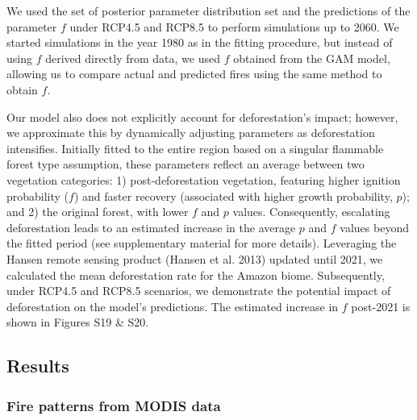 \documentclass[
]{article}
\begin{document}
We used the set of posterior parameter distribution set and the
predictions of the parameter \(f\) under RCP4.5 and RCP8.5 to perform
simulations up to 2060. We started simulations in the year 1980 as in
the fitting procedure, but instead of using \(f\) derived directly from
data, we used \(f\) obtained from the GAM model, allowing us to compare
actual and predicted fires using the same method to obtain \(f\).

Our model also does not explicitly account for deforestation's impact;
however, we approximate this by dynamically adjusting parameters as
deforestation intensifies. Initially fitted to the entire region based
on a singular flammable forest type assumption, these parameters reflect
an average between two vegetation categories: 1) post-deforestation
vegetation, featuring higher ignition probability (\(f\)) and faster
recovery (associated with higher growth probability, \(p\)); and 2) the
original forest, with lower \(f\) and \(p\) values. Consequently,
escalating deforestation leads to an estimated increase in the average
\(p\) and \(f\) values beyond the fitted period (see supplementary
material for more details). Leveraging the Hansen remote sensing product
(Hansen et al. 2013) updated until 2021, we calculated the mean
deforestation rate for the Amazon biome. Subsequently, under RCP4.5 and
RCP8.5 scenarios, we demonstrate the potential impact of deforestation
on the model's predictions. The estimated increase in \(f\) post-2021 is
shown in Figures S19 \& S20.

\subsection{Results}\label{results}

\subsubsection{Fire patterns from MODIS
data}\label{fire-patterns-from-modis-data}
\end{document}
